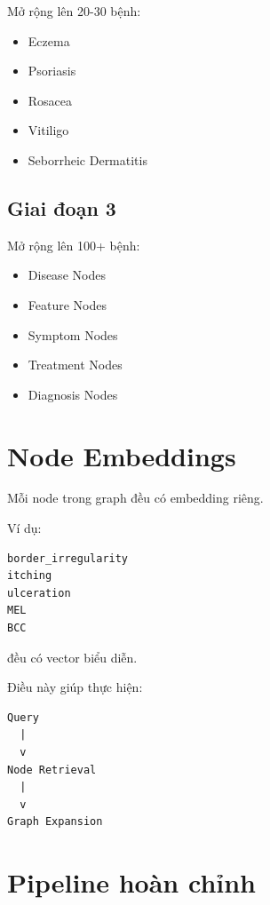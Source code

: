 \documentclass[12pt,a4paper]{article}
\begin{document}
Mở rộng lên 20-30 bệnh:

\begin{itemize}
\item Eczema
\item Psoriasis
\item Rosacea
\item Vitiligo
\item Seborrheic Dermatitis
\end{itemize}

\subsection{Giai đoạn 3}

Mở rộng lên 100+ bệnh:

\begin{itemize}
\item Disease Nodes
\item Feature Nodes
\item Symptom Nodes
\item Treatment Nodes
\item Diagnosis Nodes
\end{itemize}

\section{Node Embeddings}

Mỗi node trong graph đều có embedding riêng.

Ví dụ:

\begin{verbatim}
border_irregularity
itching
ulceration
MEL
BCC
\end{verbatim}

đều có vector biểu diễn.

Điều này giúp thực hiện:

\begin{verbatim}
Query
  |
  v
Node Retrieval
  |
  v
Graph Expansion
\end{verbatim}

\section{Pipeline hoàn chỉnh}

\begin{center}
\end{center}
\end{document}
